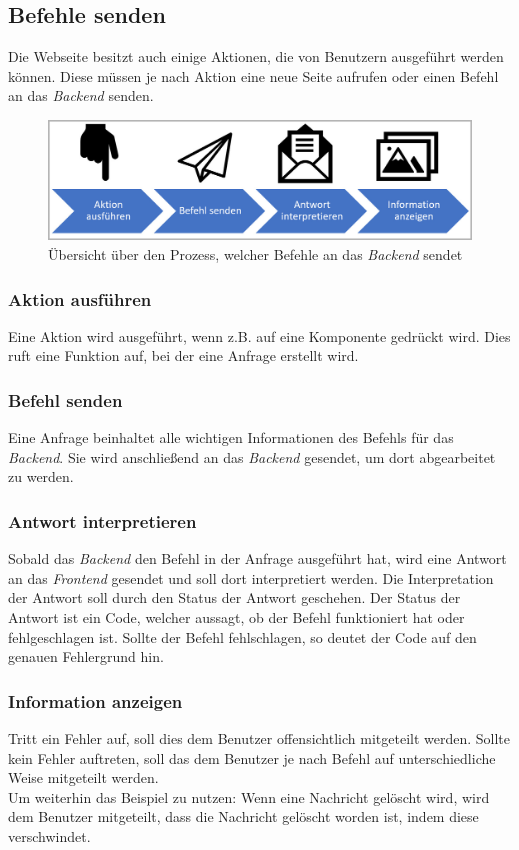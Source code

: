 \subsection{Befehle senden}
Die Webseite besitzt auch einige Aktionen, die von Benutzern ausgeführt werden können. Diese müssen je nach Aktion eine neue Seite aufrufen oder einen Befehl an das \textit{Backend} senden.

\begin{figure}[H]
	\centering
	\includegraphics[width=0.8\linewidth]{images/rfoster_konzept/Prozess_Befehl_senden}
	\caption[Prozess der Befehlssendung]{Übersicht über den Prozess, welcher Befehle an das \textit{Backend} sendet}
	\label{fig:prozessbefehlsenden}
\end{figure}

\subsubsection{Aktion ausführen}
Eine Aktion wird ausgeführt, wenn z.B. auf eine Komponente gedrückt wird. Dies ruft eine Funktion auf, bei der eine Anfrage erstellt wird.

\subsubsection{Befehl senden}
Eine Anfrage beinhaltet alle wichtigen Informationen des Befehls für das \textit{Backend}. Sie wird anschließend an das \textit{Backend} gesendet, um dort abgearbeitet zu werden.

\subsubsection{Antwort interpretieren}
Sobald das \textit{Backend} den Befehl in der Anfrage ausgeführt hat, wird eine Antwort an das \textit{Frontend} gesendet und soll dort interpretiert werden. Die Interpretation der Antwort soll durch den Status der Antwort geschehen. Der Status der Antwort ist ein Code, welcher aussagt, ob der Befehl funktioniert hat oder fehlgeschlagen ist. Sollte der Befehl fehlschlagen, so deutet der Code auf den genauen Fehlergrund hin.

\subsubsection{Information anzeigen}
Tritt ein Fehler auf, soll dies dem Benutzer offensichtlich mitgeteilt werden. Sollte kein Fehler auftreten, soll das dem Benutzer je nach Befehl auf unterschiedliche Weise mitgeteilt werden.\\
Um weiterhin das Beispiel zu nutzen: Wenn eine Nachricht gelöscht wird, wird dem Benutzer mitgeteilt, dass die Nachricht gelöscht worden ist, indem diese verschwindet.